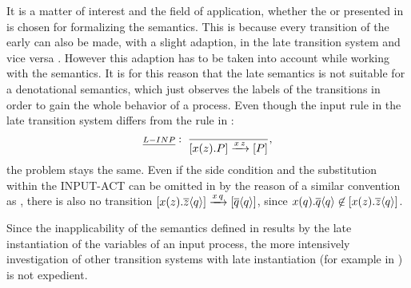 It is a matter of interest and the field of application, whether the  or  presented in \cite{sangiorgi} is chosen for formalizing the semantics. This is because every transition of the early can also be made, with a slight adaption, in the late transition system and vice versa \cite{sangiorgi}. However this adaption has to be taken into account while working with the semantics. It is for this reason that the late semantics is not suitable for a denotational semantics, which just observes the labels of the transitions in order to gain the whole behavior of a process. Even though the input rule in the late transition system differs from the rule in \cite{milnerParrowWalker}:
			\[\kalRule{L-INP}{}{}{\ec{\inp{x}{z}.P}\intrans{x}{z}\ec{P}}{},\]
the problem stays the same. Even if the side condition and the substitution within the INPUT-ACT can be omitted in \cite{sangiorgi} by the reason of a similar convention as , there is also no transition $\left[x(z).\overline{z}\langle q\rangle\right]\xrightarrow{x\,q}\left[\overline{q}\langle q\rangle\right]$, since $x(q).\overline{q}\langle q\rangle\not\in\left[x(z).\overline{z}\langle q\rangle\right]$.

Since the inapplicability of the semantics defined in \cite{milnerParrowWalker, sangiorgi} results by the late instantiation of the variables of an input process, the more intensively investigation of other transition systems with late instantiation (for example in \cite{canal, paolaDiss, alexandru}) is not expedient.



